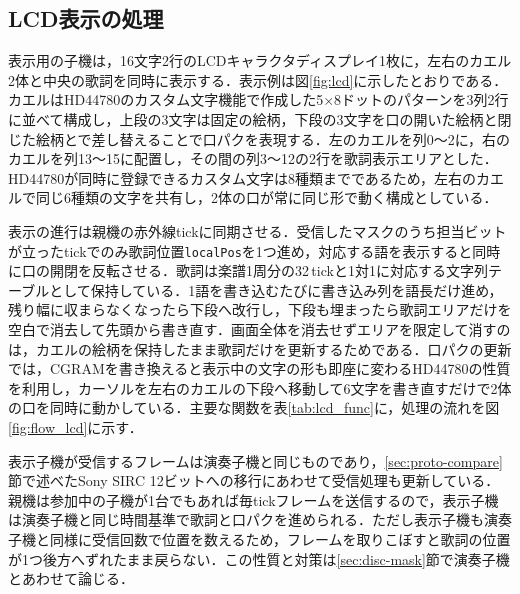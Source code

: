 \subsection{LCD表示の処理}
\label{sec:lcd-impl}

表示用の子機は，16文字2行のLCDキャラクタディスプレイ1枚に，左右のカエル2体と中央の歌詞を同時に表示する．表示例は図\ref{fig:lcd}に示したとおりである．カエルはHD44780のカスタム文字機能で作成した5$\times$8ドットのパターンを3列2行に並べて構成し，上段の3文字は固定の絵柄，下段の3文字を口の開いた絵柄と閉じた絵柄とで差し替えることで口パクを表現する．左のカエルを列0〜2に，右のカエルを列13〜15に配置し，その間の列3〜12の2行を歌詞表示エリアとした．HD44780が同時に登録できるカスタム文字は8種類までであるため，左右のカエルで同じ6種類の文字を共有し，2体の口が常に同じ形で動く構成としている．

表示の進行は親機の赤外線tickに同期させる．受信したマスクのうち担当ビットが立ったtickでのみ歌詞位置\texttt{localPos}を1つ進め，対応する語を表示すると同時に口の開閉を反転させる．歌詞は楽譜1周分の32\,tickと1対1に対応する文字列テーブルとして保持している．1語を書き込むたびに書き込み列を語長だけ進め，残り幅に収まらなくなったら下段へ改行し，下段も埋まったら歌詞エリアだけを空白で消去して先頭から書き直す．画面全体を消去せずエリアを限定して消すのは，カエルの絵柄を保持したまま歌詞だけを更新するためである．口パクの更新では，CGRAMを書き換えると表示中の文字の形も即座に変わるHD44780の性質を利用し，カーソルを左右のカエルの下段へ移動して6文字を書き直すだけで2体の口を同時に動かしている．主要な関数を表\ref{tab:lcd_func}に，処理の流れを図\ref{fig:flow_lcd}に示す．

表示子機が受信するフレームは演奏子機と同じものであり，\ref{sec:proto-compare}節で述べたSony SIRC 12ビットへの移行にあわせて受信処理も更新している．親機は参加中の子機が1台でもあれば毎tickフレームを送信するので，表示子機は演奏子機と同じ時間基準で歌詞と口パクを進められる．ただし表示子機も演奏子機と同様に受信回数で位置を数えるため，フレームを取りこぼすと歌詞の位置が1つ後方へずれたまま戻らない．この性質と対策は\ref{sec:disc-mask}節で演奏子機とあわせて論じる．

